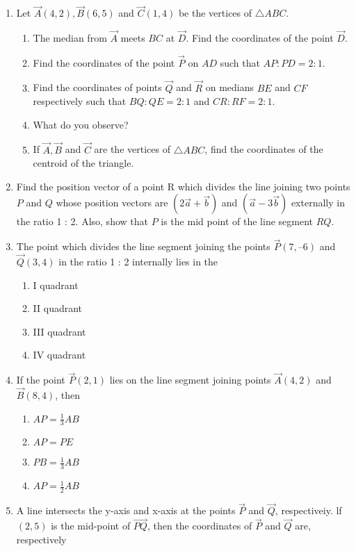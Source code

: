 \begin{enumerate}[label=\thesubsection.\arabic*,ref=\thesubsection.\theenumi]
\\
\solution
	
\item Let $\vec{A}(4, 2), \vec{B}(6, 5)$  and $ \vec{C}(1, 4)$ be the vertices of $\triangle ABC$.
\begin{enumerate}
\item The median from $\vec{A}$ meets $BC$ at $\vec{D}$. Find the coordinates of the point $\vec{D}$.
\item Find the coordinates of the point $\vec{P}$ on $AD$ such that $AP : PD = 2 : 1$.
\item Find the coordinates of points $\vec{Q}$ and $\vec{R}$ on medians $BE$ and $CF$ respectively such that $BQ : QE = 2 : 1$  and  $CR : RF = 2 : 1$.
\item What do you observe?
\item If $\vec{A}, \vec{B}$ and $\vec{C}$  are the vertices of $\triangle ABC$, find the coordinates of the centroid of the triangle.
\end{enumerate}
\solution
	
\item Find the position vector of a point R which divides the line joining two points $P$ and $Q$ whose position vectors are $(2\vec{a}+\vec{b})$ and $(\vec{a}-3\vec{b})$
externally in the ratio 1 : 2. Also, show that $P$ is the mid point of the line segment $RQ$.\\
	\solution
		
\item The point which divides the line segment joining the points $\vec{P} (7, –6) $  and  $\vec{Q}(3, 4)$ in the 
ratio 1 : 2 internally lies in the
\begin{enumerate}
\item I quadrant
\item  II quadrant
\item  III quadrant
\item  IV quadrant
\end{enumerate}
\item If the point $\vec{P} (2, 1)$ lies on the line segment joining points $\vec{A} (4, 2)$  and $ \vec{B} (8, 4)$,
then
\begin{enumerate}
	\item $AP =\frac{1}{3}{AB}$ 
\item ${AP}={PE}$
\item ${PB}=\frac{1}{3}{AB}$
\item${AP}=\frac{1}{2}{AB}$
 \end{enumerate}
\item A line intersects the y-axis and x-axis at the points $\vec{P}$  and $\vec{Q}$, respectiveiy. lf $(2,5)$ is the mid-point of $\vec{PQ}$, then the coordinates of $\vec{P}$ and $ \vec{Q}$ are, respectively

\end{enumerate}

